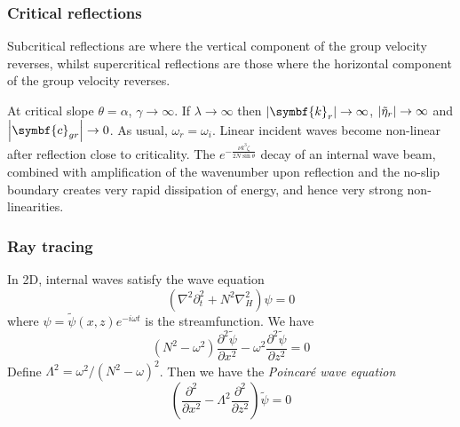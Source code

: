 \documentclass{jknotes}
\begin{document}
\subsubsection{Critical reflections}
Subcritical reflections are where the vertical component of the group velocity
reverses, whilst supercritical reflections are those where the horizontal
component of the group velocity reverses. 

\begin{center}
\end{center}

At critical slope $\theta = \alpha$,
$\gamma \to \infty$.  If $\lambda \to \infty$ then $\abs{\symbf{k}_r} \to
\infty$, $\abs{\tilde{\eta}_r} \to \infty$ and $\abs{\symbf{c}_{gr}} \to
0$. As usual, $\omega_r = \omega_i$. Linear incident waves become non-linear
after reflection close to criticality. The $e^{-\frac{\nu k^3 \zeta}{2N \sin
\theta}}$ decay of an internal wave beam, combined with amplification of the
wavenumber upon reflection and the no-slip boundary creates very rapid
dissipation of energy, and hence very strong non-linearities.

\subsubsection{Ray tracing}
In 2D, internal waves satisfy the wave equation
\begin{equation}
	\left(\nabla^2 \partial_t^2 + N^2 \nabla_H^2\right) \psi = 0
\end{equation}
where $\psi = \tilde{\psi}(x,z)e^{-i\omega t}$ is the streamfunction. We have
\begin{equation}
	(N^2 - \omega^2) \frac{\partial^2 \tilde{\psi}}{\partial x^2} - \omega^2
	\frac{\partial^2 \tilde{\psi}}{\partial z^2} = 0
\end{equation}
Define $\Lambda^2 = \omega^2 / (N^2-\omega)^2$. Then we have the
\emph{Poincar\'{e} wave equation}
\begin{equation}
	\left( \frac{\partial^2}{\partial x^2} - \Lambda^2
	\frac{\partial^2}{\partial z^2}\right) \tilde{\psi} = 0
\end{equation}
\end{document}
